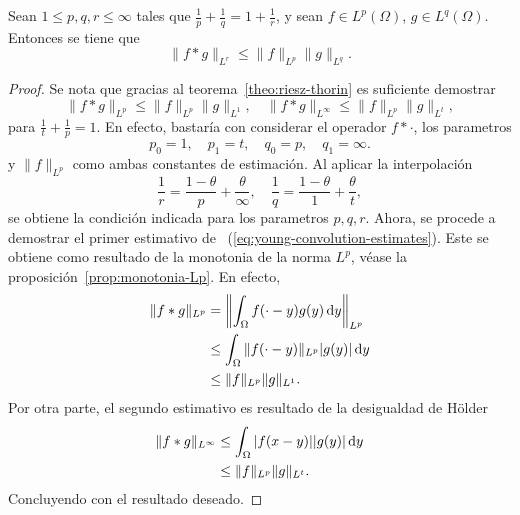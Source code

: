 \begin{proposition}
    Sean $1\leq p,q,r\leq \infty$ tales que $\frac{1}{p} + \frac{1}{q} = 1 + 
    \frac{1}{r}$, y sean $f \in L^p(\Omega)$, $g\in L^q(\Omega)$. Entonces
    se tiene que
    \begin{equation*}
        \|f*g\|_{L^r} \leq \|f\|_{L^p} \|g\|_{L^q}.
    \end{equation*}
\end{proposition}
\begin{proof}
    Se nota que gracias al teorema~\ref{theo:riesz-thorin} es suficiente 
    demostrar 
    \begin{equation}\label{eq:young-convolution-estimates}
        \|f*g\|_{L^p} \leq \|f\|_{L^p} \|g\|_{L^1}, \quad 
        \|f*g\|_{L^\infty} \leq \|f\|_{L^p} \|g\|_{L^t},
    \end{equation}
    para $\frac{1}{t} + \frac{1}{p} = 1$. En efecto, bastaría con considerar 
    el operador $f * \cdot$, los parametros
    \begin{equation*}
        p_0 = 1, \quad p_1 = t, \quad q_0 = p, \quad q_1 = \infty.
    \end{equation*}
    y $\|f\|_{L^p}$ como ambas constantes de estimación.
    Al aplicar la interpolación
    \begin{equation*}
        \frac{1}{r} = \frac{1-\theta}{p} + \frac{\theta}{\infty}, \quad 
        \frac{1}{q} = \frac{1-\theta}{1} + \frac{\theta}{t},
    \end{equation*}
    se obtiene la condición indicada para los parametros $p, q, r$. Ahora, 
    se procede a demostrar el primer estimativo de
    ~(\ref{eq:young-convolution-estimates}). Este se obtiene como resultado de
    la monotonia de la norma $L^p$, véase la proposición~\ref{prop:monotonia-Lp}.
    En efecto,
    \begin{align*}
        \|f*g\|_{L^p} & = \left\| \int_{\Omega} f(\cdot-y)g(y)\mathop{}\!\mathrm{d} y 
        \right\|_{L^p} \\
        & \leq \int_{\Omega} \|f(\cdot-y)\|_{L^p} |g(y)|\mathop{}\!\mathrm{d} y \\
        & \leq \|f\|_{L^p}\|g\|_{L^1}.
    \end{align*}
    Por otra parte, el segundo estimativo es resultado de la desigualdad de 
    H\"older 
    \begin{align*}
        \|f*g\|_{L^\infty} & \leq \int_{\Omega} |f(x-y)||g(y)| \mathop{}\!\mathrm{d} y \\
        & \leq \|f\|_{L^p}\|g\|_{L^t}.
    \end{align*}
    Concluyendo con el resultado deseado.
\end{proof}
